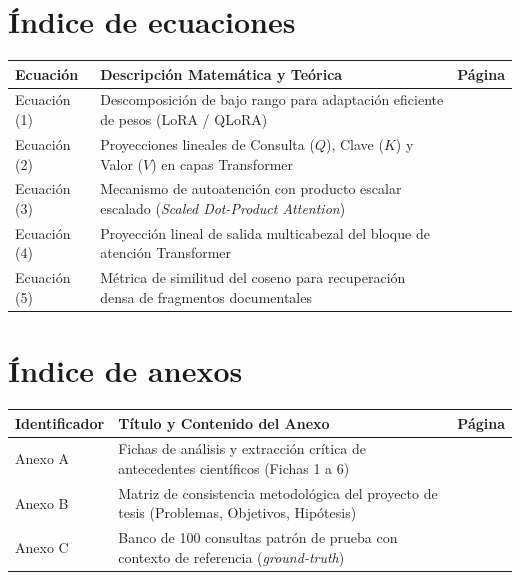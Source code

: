 \newpage
{}
{}
\section*{Índice de ecuaciones}

\begin{table}[H]
\centering
\small
\begin{tabularx}{\textwidth}{@{}p{2.2cm}p{9.0cm}c@{}}
\toprule
\rowcolor{tcAzul!12}
\textbf{Ecuación} & \textbf{Descripción Matemática y Teórica} & \textbf{Página} \\
\midrule
Ecuación (1) & Descomposición de bajo rango para adaptación eficiente de pesos (LoRA / QLoRA) & \pageref{fig:esquema_qlora} \\
Ecuación (2) & Proyecciones lineales de Consulta ($Q$), Clave ($K$) y Valor ($V$) en capas Transformer & \pageref{fig:esquema_qlora} \\
Ecuación (3) & Mecanismo de autoatención con producto escalar escalado (\textit{Scaled Dot-Product Attention}) & \pageref{fig:esquema_qlora} \\
Ecuación (4) & Proyección lineal de salida multicabezal del bloque de atención Transformer & \pageref{fig:esquema_qlora} \\
Ecuación (5) & Métrica de similitud del coseno para recuperación densa de fragmentos documentales & \pageref{fig:pipeline_rag} \\
\bottomrule
\end{tabularx}
\end{table}

\newpage
{}
{}
\section*{Índice de anexos}

\begin{table}[H]
\centering
\small
\begin{tabularx}{\textwidth}{@{}p{2.6cm}p{8.5cm}c@{}}
\toprule
\rowcolor{tcAzul!12}
\textbf{Identificador} & \textbf{Título y Contenido del Anexo} & \textbf{Página} \\
\midrule
Anexo A & Fichas de análisis y extracción crítica de antecedentes científicos (Fichas 1 a 6) & \pageref{sec:anexos} \\
Anexo B & Matriz de consistencia metodológica del proyecto de tesis (Problemas, Objetivos, Hipótesis) & \pageref{tab:matriz_consistencia} \\
Anexo C & Banco de 100 consultas patrón de prueba con contexto de referencia (\textit{ground-truth}) & \pageref{tab:metricas} \\
\bottomrule
\end{tabularx}
\end{table}

